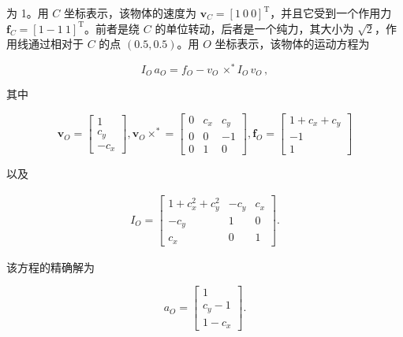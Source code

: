 \documentclass[10pt,a4paper]{book}
\theoremstyle{thmstyle} %
\theoremstyle{defstyle} %
\theoremstyle{prostyle} %
\begin{document}
为 1。用 $C$ 坐标表示，该物体的速度为 $\boldsymbol{v}_{C}=[1\ 0\ 0]^{\mathrm{T}}$，并且它受到一个作用力 $\boldsymbol{f}_{C}=[1-1\ 1]^{\mathrm{T}}$。前者是绕 $C$ 的单位转动，后者是一个纯力，其大小为 $\sqrt{2}$，作用线通过相对于 $C$ 的点 $(0.5,0.5)$。用 $O$ 坐标表示，该物体的运动方程为



$$
I _ { O } \, a _ { O } = f _ { O } - v _ { O } \, \times ^{*} I _ { O } \, v _ { O } \, ,
$$



其中



$$
\boldsymbol{ v } _ { O } = \left[ \begin{array}{l} { 1 } \\{ c _ { y } } \\{ - c _ { x } } \end{array} \right] ,  \boldsymbol{ v } _ { O } \times ^{*} = \left[ \begin{array}{lll} { 0 } & { c _ { x } } & { c _ { y } } \\{ 0 } & { 0 } & { - 1 } \\{ 0 } & { 1 } & { 0 } \end{array} \right] ,  \boldsymbol{ f } _ { O } = \left[ \begin{array}{l} { 1 + c _ { x } + c _ { y } } \\{ - 1 } \\{ 1 } \end{array} \right]
$$



以及



$$
\begin{array}{r} { I _ { O } = \left[ \begin{array}{lll} { 1 + c _ { x } ^{2} + c _ { y } ^{2} } & { - c _ { y } } & { c _ { x } } \\{ - c _ { y } } & { 1 } & { 0 } \\{ c _ { x } } & { 0 } & { 1 } \end{array} \right] . } \end{array}
$$



该方程的精确解为



$$
a _ { O } = \left[ \begin{array}{l} { { 1 } } \\{ { c _ { y } - 1 } } \\{ { 1 - c _ { x } } } \end{array} \right] .
$$
\end{document}
